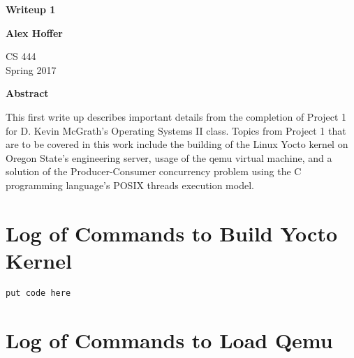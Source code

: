 \documentclass[letterpaper,10pt,titlepage]{article}
\begin{document}
\begin{titlepage}
    \begin{center}
        \vspace*{3.5cm}

        \textbf{Writeup 1}

        \vspace{0.5cm}

        \textbf{Alex Hoffer}

        \vspace{0.8cm}

        CS 444\\
        Spring 2017\\

        \vspace{1cm}

        \textbf{Abstract}\\

        \vspace{0.5cm}

        This first write up describes important details from the completion of Project 1 for D. Kevin McGrath's Operating Systems II class. Topics from Project 1 that are to be covered in this work include the building of the Linux Yocto kernel on Oregon State's engineering server, usage of the qemu virtual machine, and a solution of the Producer-Consumer concurrency problem using the C programming language's POSIX threads execution model. 

        \vfill

    \end{center}
\end{titlepage}

\newpage

\tableofcontents

\newpage

\section{Log of Commands to Build Yocto Kernel}
\begin{lstlisting}
put code here
\end{lstlisting}

\section{Log of Commands to Load Qemu}
\end{document}
